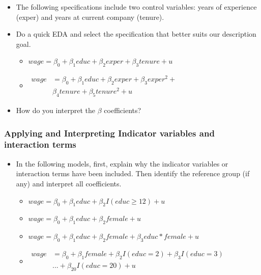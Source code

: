\documentclass[
  letterpaper,
  DIV=11,
  numbers=noendperiod]{scrreprt}
\begin{document}
\begin{itemize}
\item
  The following specifications include two control variables: years of
  experience (exper) and years at current company (tenure).
\item
  Do a quick EDA and select the specification that better suits our
  description goal.

  \begin{itemize}
  \item
    \(wage = \beta_0 + \beta_1 educ + \beta_2 exper + \beta_3 tenure + u\)
  \item
    \(\begin{aligned}
    wage &= \beta_0 + \beta_1 educ + \beta_2 exper + \beta_3 exper^2 + \\
    & \beta_4 tenure + \beta_5 tenure^2 + u
    \end{aligned}\)
  \end{itemize}
\item
  How do you interpret the \(\beta\) coefficients?
\end{itemize}

\subsubsection{Applying and Interpreting Indicator variables and
interaction
terms}\label{applying-and-interpreting-indicator-variables-and-interaction-terms}

\begin{itemize}
\item
  In the following models, first, explain why the indicator variables or
  interaction terms have been included. Then identify the reference
  group (if any) and interpret all coefficients.

  \begin{itemize}
  \item
    \(wage = \beta_0 + \beta_1 educ + \beta_2 I(educ \geq 12) + u\)
  \item
    \(wage = \beta_0 + \beta_1 educ + \beta_2 female + u\)
  \item
    \(wage = \beta_0 + \beta_1 educ + \beta_2 female + \beta_3 educ*female + u\)
  \item
    \(\begin{aligned}
    wage &= \beta_0 + \beta_1 female + \beta_2 I(educ = 2) + \beta_3 I(educ = 3)\\
    &...+ \beta_{20} I(educ = 20) + u\\
    \end{aligned}\)
  \end{itemize}
\end{itemize}
\end{document}
